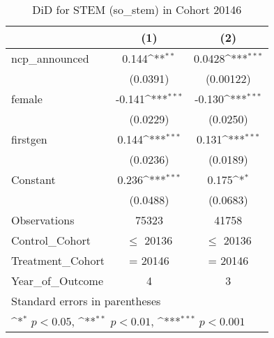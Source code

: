\begin{table}[htbp]\centering
\def\sym#1{\ifmmode^{#1}\else\(^{#1}\)\fi}
\caption{DiD for STEM (so\_stem) in Cohort 20146}
\begin{tabular}{l*{2}{c}}
\toprule
                &\multicolumn{1}{c}{(1)}         &\multicolumn{1}{c}{(2)}         \\
\midrule
ncp\_announced   &    0.144\sym{**} &   0.0428\sym{***}\\
                & (0.0391)         &(0.00122)         \\
\addlinespace
female          &   -0.141\sym{***}&   -0.130\sym{***}\\
                & (0.0229)         & (0.0250)         \\
\addlinespace
firstgen        &    0.144\sym{***}&    0.131\sym{***}\\
                & (0.0236)         & (0.0189)         \\
\addlinespace
Constant        &    0.236\sym{***}&    0.175\sym{*}  \\
                & (0.0488)         & (0.0683)         \\
\midrule
Observations    &    75323         &    41758         \\
Control\_Cohort  &$\le$ 20136         &$\le$ 20136         \\
Treatment\_Cohort&  = 20146         &  = 20146         \\
Year\_of\_Outcome &        4         &        3         \\
\bottomrule
\multicolumn{3}{l}{\footnotesize Standard errors in parentheses}\\
\multicolumn{3}{l}{\footnotesize \sym{*} \(p<0.05\), \sym{**} \(p<0.01\), \sym{***} \(p<0.001\)}\\
\end{tabular}
\end{table}
